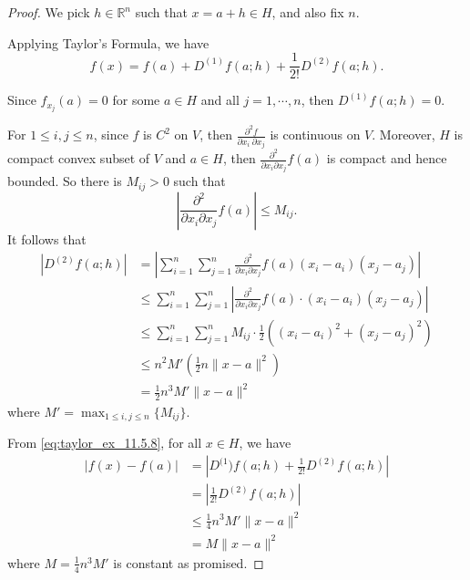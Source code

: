 \begin{Exercise}
\begin{proof}
We pick $h\in\mathbb{R}^n$ such that $x=a+h\in H$, and also fix $n$.

Applying Taylor's Formula, we have
\begin{equation}
f(x)=f(a)+D^{(1)}f(a;h)+\frac{1}{2!}D^{(2)}f(a;h). \label{eq:taylor_ex_11.5.8}
\end{equation}

Since $f_{x_j}(a) = 0$ for some $a\in H$ and all $j=1,\cdots, n$, then $D^{(1)}f(a;h)=0$.

For $1\leq i,j \leq n$, since $f$ is $C^2$ on $V$, then $\frac{\partial^2 f}{\partial x_i\ \partial x_j}$ is continuous on $V$. Moreover, $H$ is compact convex subset of $V$ and $a\in H$, then $\frac{\partial^2}{\partial x_i \partial x_j} f(a)$ is compact and hence bounded. So there is $M_{i j}>0$ such that
$$
\left| \frac{\partial^2}{\partial x_i \partial x_j} f(a) \right |\leq M_{i j}.
$$
It follows that
\begin{align*}
\left| D^{(2)}f(a;h) \right|
&= \left| \sum_{i=1}^{n}\sum_{j=1}^{n} \frac{\partial^2}{\partial x_i \partial x_j} f(a)(x_i-a_i)(x_j-a_j) \right| \\
&\leq \sum_{i=1}^{n}\sum_{j=1}^{n} \left| \frac{\partial^2}{\partial x_i \partial x_j} f(a)\cdot(x_i-a_i)(x_j-a_j) \right| \\
&\leq \sum_{i=1}^{n}\sum_{j=1}^{n} M_{i j}\cdot\frac{1}{2} \left( (x_i-a_i)^2 + (x_j-a_j)^2 \right) \\
&\leq n^2 M' \left( \frac{1}{2} n \| x-a \|^2 \right) \\
&= \frac{1}{2}n^3 M'\|x-a\|^2
\end{align*}
where $M' = \max_{1\leq i,j\leq n}\{M_{i j}\}$.

From \eqref{eq:taylor_ex_11.5.8}, for all $x\in H$, we have
\begin{align*}
|f(x)-f(a)| 
&= \left|D^{(1})f(a;h)+\frac{1}{2!}D^{(2)}f(a;h) \right| \\
&= \left| \frac{1}{2!}D^{(2)}f(a;h) \right| \\
&\leq \frac{1}{4} n^3 M' \|x-a\|^2 \\
&= M\|x-a\|^2
\end{align*}
where $M=\frac{1}{4}n^3 M'$ is constant as promised.
\end{proof}
\end{Exercise}